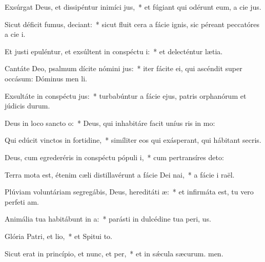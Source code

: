 \item Exsúrgat Deus, et dissipéntur inimíci jus,~* et fúgiant qui odérunt eum, a cie jus.
\item Sicut déficit fumus, deciant:~* sicut fluit cera a fácie ignis, sic péreant peccatóres a cie i.
\item Et justi epuléntur, et exsúltent in conspéctu i:~* et delecténtur  lætia.
\item Cantáte Deo, psalmum dícite nómini jus:~* iter fácite ei, qui ascéndit super occásum: Dóminus men li.
\item Exsultáte in conspéctu jus:~* turbabúntur a fácie ejus, patris orphanórum et júdicis durum.
\item Deus in loco sancto o:~* Deus, qui inhabitáre facit uníus ris in mo:
\item Qui edúcit vinctos in fortidine,~* simíliter eos qui exásperant, qui hábitant  secris.
\item Deus, cum egrederéris in conspéctu pópuli i,~* cum pertransíres  deto:
\item Terra mota est, étenim cæli distillavérunt a fácie Dei nai,~* a fácie i raël.
\item Plúviam voluntáriam segregábis, Deus, hereditáti æ:~* et infirmáta est, tu vero perfeti am.
\item Animália tua habitábunt in a:~* parásti in dulcédine tua peri, us.
\item Glória Patri, et lio,~* et Spitui to.
\item Sicut erat in princípio, et nunc, et per,~* et in sǽcula sæcurum. men.
